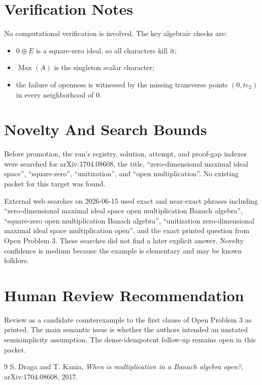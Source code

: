 \documentclass[11pt]{amsart}
\newcommand{\Max}{\operatorname{Max}}
\begin{document}
\section*{Verification Notes}

No computational verification is involved.  The key algebraic checks are:
\begin{itemize}
\item \(0\oplus E\) is a square-zero ideal, so all characters kill it;
\item \(\Max(A)\) is the singleton scalar character;
\item the failure of openness is witnessed by the missing transverse points
\((0,t e_2)\) in every neighborhood of \(0\).
\end{itemize}

\section*{Novelty And Search Bounds}

Before promotion, the run's registry, solution, attempt, and proof-gap indexes
were searched for arXiv:1704.08608, the title, ``zero-dimensional maximal
ideal space'', ``square-zero'', ``unitization'', and ``open multiplication''.
No existing packet for this target was found.

External web searches on 2026-06-15 used exact and near-exact phrases
including ``zero-dimensional maximal ideal space open multiplication Banach
algebra'', ``square-zero open multiplication Banach algebra'', ``unitization
zero-dimensional maximal ideal space multiplication open'', and the exact
printed question from Open Problem 3.  These searches did not find a later
explicit answer.  Novelty confidence is medium because the example is
elementary and may be known folklore.

\section*{Human Review Recommendation}

Review as a candidate counterexample to the first clause of Open Problem 3 as
printed.  The main semantic issue is whether the authors intended an unstated
semisimplicity assumption.  The dense-idempotent follow-up remains open in
this packet.

\begin{thebibliography}{9}
S. Draga and T. Kania,
\emph{When is multiplication in a Banach algebra open?},
arXiv:1704.08608, 2017.
\end{thebibliography}
\end{document}
